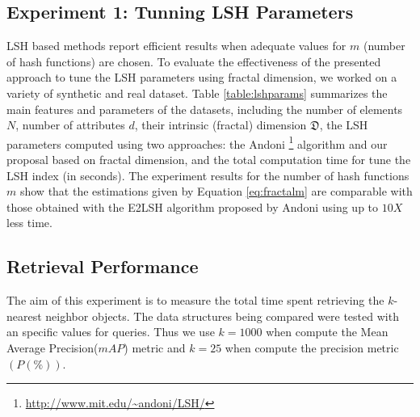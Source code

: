 \documentclass{article}
\begin{document}
 





\subsection{Experiment 1: Tunning LSH Parameters}

LSH based methods report efficient results when adequate values for $m$ (number of hash functions) are chosen. To evaluate the effectiveness of the presented approach to tune the LSH parameters using fractal dimension, we worked on a variety of synthetic and real dataset. Table \ref{table:lshparams} summarizes the main features and parameters of the datasets, including the number of elements $N$, number of attributes $d$,   their intrinsic (fractal) dimension $\mathfrak{D}$, the LSH parameters computed using two approaches: the Andoni \footnote{\url{http://www.mit.edu/~andoni/LSH/}} algorithm and our proposal based on fractal dimension, and the total computation time for tune the LSH index (in seconds).  The experiment results for the number of hash functions $m$  show that the estimations given by Equation \ref{eq:fractalm} are comparable with those obtained with the E2LSH algorithm proposed by Andoni using up to $10X$ less time.
 


\subsection{Retrieval Performance} %
 The aim of this experiment is to measure the total time   spent  retrieving the $k$-nearest neighbor objects. The data structures being compared were tested with an specific values for queries. Thus we use   $k=1000$   when compute the Mean Average Precision($mAP$) metric and $k=25$ when compute the  precision metric $(P (\%))$.
 
\end{document}
